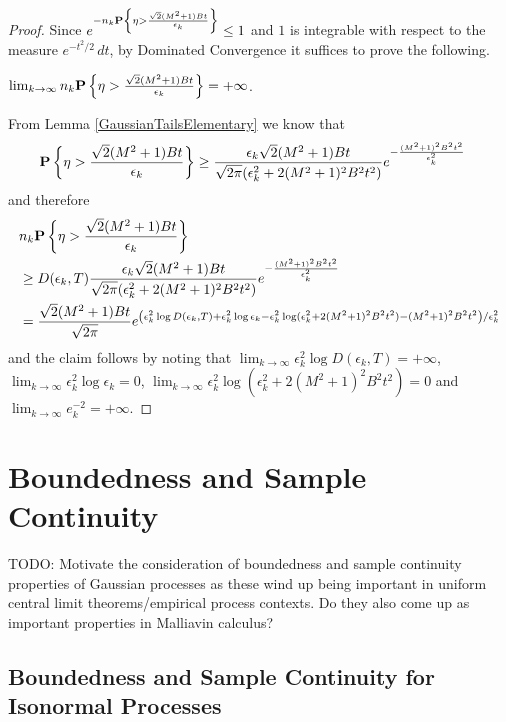\begin{proof}
Since $e^{-n_k \textbf{P}\left \{\eta > \frac{\sqrt{2}(M^2+1)Bt}{\epsilon_k} \right \}} \leq 1$ and $1$ is integrable with respect to the measure $e^{-t^2/2} \, dt$, by Dominated Convergence it suffices to prove the following.
\begin{clm}$\lim_{k \to \infty} n_k \textbf{P}\left \{\eta > \frac{\sqrt{2}(M^2+1)Bt}{\epsilon_k} \right \} = +\infty$.
\end{clm}
From Lemma \ref{GaussianTailsElementary} we know that 
\begin{align*}
\textbf{P}\left \{\eta > \frac{\sqrt{2}(M^2+1)Bt}{\epsilon_k} \right \}
&\geq \frac{\epsilon_k \sqrt{2}(M^2+1)Bt}{\sqrt{2\pi} (\epsilon_k^2 + 2(M^2+1)^2B^2t^2)} e^{-\frac{(M^2+1)^2B^2t^2}{\epsilon^2_k}}
\end{align*}
and therefore
\begin{align*}
&n_k \textbf{P}\left \{\eta > \frac{\sqrt{2}(M^2+1)Bt}{\epsilon_k} \right \} \\
&\geq D(\epsilon_k, T) \frac{\epsilon_k \sqrt{2}(M^2+1)Bt}{\sqrt{2\pi} (\epsilon_k^2 + 2(M^2+1)^2B^2t^2)} e^{-\frac{(M^2+1)^2B^2t^2}{\epsilon^2_k}} \\
&= \frac{\sqrt{2}(M^2+1)Bt}{\sqrt{2\pi}} e^{\left( \epsilon_k^2 \log D(\epsilon_k, T) +  \epsilon_k^2 \log \epsilon_k -  \epsilon_k^2 \log (\epsilon_k^2 + 2(M^2+1)^2B^2t^2) -(M^2+1)^2B^2t^2\right)/\epsilon^2_k} \\
\end{align*}
and the claim follows by noting that $\lim_{k \to \infty} \epsilon_k^2 \log D(\epsilon_k, T) = +\infty$, $\lim_{k \to \infty} \epsilon_k^2 \log \epsilon_k =0$, 
$\lim_{k \to \infty} \epsilon_k^2 \log (\epsilon_k^2 + 2(M^2+1)^2B^2t^2) =0$ and $\lim_{k \to \infty} e_k^{-2} = +\infty$.
\end{proof}

\section{Boundedness and Sample Continuity}

TODO: Motivate the consideration of boundedness and sample continuity properties of Gaussian processes as these wind up being important in uniform central limit theorems/empirical process contexts.  Do they also come up as important properties in Malliavin calculus?

\subsection{Boundedness and Sample Continuity for Isonormal Processes}

